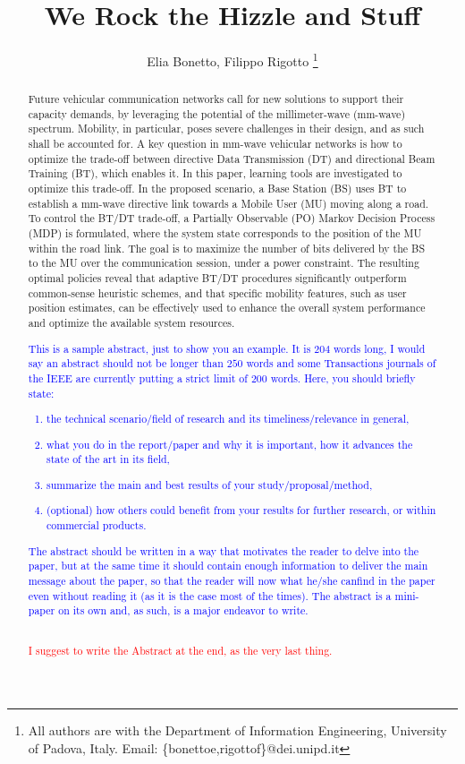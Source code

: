 \documentclass[10pt, conference, letterpaper]{IEEEtran}
\title{We Rock the Hizzle and Stuff}
\author{Elia Bonetto, Filippo Rigotto
\thanks{All authors are with the Department of Information Engineering, University of Padova, Italy. Email: \{bonettoe,rigottof\}@dei.unipd.it}}
\newcommand\MR[1]{\textcolor{blue}{#1}}
\newcommand\red[1]{\textcolor{red}{#1}}
\begin{document}
\maketitle

\begin{abstract}
Future vehicular communication networks call for new solutions to support their capacity demands, by leveraging the potential of the \mbox{millimeter-wave} (\mbox{mm-wave}) spectrum. Mobility, in particular, poses severe challenges in their design, and as such shall be accounted for. A key question in \mbox{mm-wave} vehicular networks is how to optimize the \mbox{trade-off} between directive Data Transmission (DT) and directional Beam Training (BT), which enables it. In this paper, learning tools are investigated to optimize this \mbox{trade-off}. In the proposed scenario, a Base Station (BS) uses BT to establish a \mbox{mm-wave} directive link towards a Mobile User (MU) moving along a road. To control the BT/DT \mbox{trade-off}, a Partially Observable (PO) Markov Decision Process (MDP) is formulated, where the system state corresponds to the position of the MU within the road link. The goal is to maximize the number of bits delivered by the BS to the MU over the communication session, under a power constraint. The resulting optimal policies reveal that adaptive BT/DT procedures significantly outperform \mbox{common-sense} heuristic schemes, and that specific mobility features, such as user position estimates, can be effectively used to enhance the overall system performance and optimize the available system resources.\\

\MR{This is a sample abstract, just to show you an example. It is $204$ words long, I would say an abstract should not be longer than $250$ words and some Transactions journals of the IEEE are currently putting a strict limit of $200$ words. Here, you should briefly state:
\begin{enumerate}
\item the technical scenario/field of research and its timeliness/relevance in general,
\item what you do in the report/paper and why it is important, how it advances the state of the art in its field,
\item summarize the main and best results of your study/proposal/method,
\item (optional) how others could benefit from your results for further research, or within commercial products.
\end{enumerate}
The abstract should be written in a way that motivates the reader to delve into the paper, but at the same time it should contain enough information to deliver the main message about the paper, so that the reader will now what he/she canfind in the paper even without reading it (as it is the case most of the times). The abstract is a mini-paper on its own and, as such, is a major endeavor to write.}\\

\red{I suggest to write the Abstract at the end, as the very last thing.}
\end{abstract}
\end{document}
